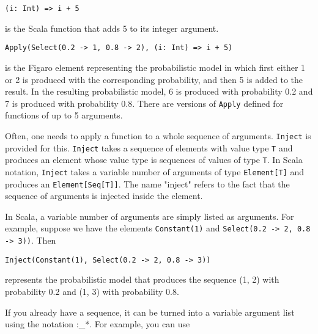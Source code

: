 \begin{flushleft}
\texttt{(i: Int) => i + 5}
\end{flushleft}

is the Scala function that adds 5 to its integer argument.

\begin{flushleft}
\texttt{Apply(Select(0.2 -> 1, 0.8 -> 2), (i: Int) => i + 5)}
\end{flushleft}

is the Figaro element representing the probabilistic model in which first either 1 or 2 is produced with the corresponding probability, and then 5 is added to the result. In the resulting probabilistic model, 6 is produced with probability 0.2 and 7 is produced with probability 0.8. There are versions of \texttt{Apply} defined for functions of up to 5 arguments. 


Often, one needs to apply a function to a whole sequence of arguments. \texttt{Inject} is provided for this. \texttt{Inject} takes a sequence of elements with value type \texttt{T} and produces an element whose value type is sequences of values of type \texttt{T}. In Scala notation, \texttt{Inject} takes a variable number of arguments of type \texttt{Element[T]} and produces an \texttt{Element[Seq[T]]}. The name "inject" refers to the fact that the sequence of arguments is injected inside the element.

In Scala, a variable number of arguments are simply listed as arguments. For example, suppose we have the elements \texttt{Constant(1)} and  \texttt{Select(0.2 -> 2, 0.8 -> 3))}. Then

\begin{flushleft}
\texttt{Inject(Constant(1), Select(0.2 -> 2, 0.8 -> 3))}
\end{flushleft}

represents the probabilistic model that produces the sequence (1, 2) with probability
0.2 and (1, 3) with probability 0.8.

If you already have a sequence, it can be turned into a variable argument list using the notation :\_*. For example, you can use

